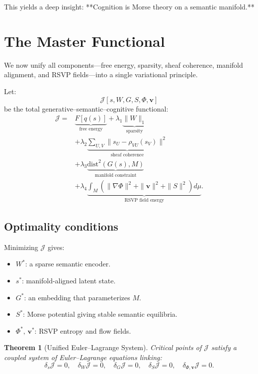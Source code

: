 \documentclass[11pt,a4paper,twocolumn]{article}
\newtheorem{theorem}{Theorem}[section]
\begin{document}
This yields a deep insight:  
**Cognition is Morse theory on a semantic manifold.**



\section{The Master Functional}

We now unify all components—free energy, sparsity, sheaf coherence,
manifold alignment, and RSVP fields—into a single variational principle.

Let:
\[
\mathcal{J}[s, W, G, S, \Phi, \mathbf{v}]
\]
be the total generative–semantic–cognitive functional:
\begin{align}
\mathcal{J}
=
&\underbrace{F[q(s)]}_{\text{free energy}}
+ \lambda_1 \underbrace{\|W\|_1}_{\text{sparsity}} \\
&+ \lambda_2 \underbrace{\sum_{U,V} \|s_U - \rho_{VU}(s_V)\|^2}_{\text{sheaf coherence}} \\
&+ \lambda_3 \underbrace{\mathrm{dist}^2(G(s), M)}_{\text{manifold constraint}} \\
&+ \lambda_4 \underbrace{\int_M \left(\|\nabla \Phi\|^2 + \|\mathbf{v}\|^2 + \|S\|^2\right) d\mu}_{\text{RSVP field energy}}.
\end{align}

\subsection{Optimality conditions}

Minimizing $\mathcal{J}$ gives:

\begin{itemize}
\item $W^\ast$: a sparse semantic encoder.
\item $s^\ast$: manifold-aligned latent state.
\item $G^\ast$: an embedding that parameterizes $M$.
\item $S^\ast$: Morse potential giving stable semantic equilibria.
\item $\Phi^\ast,\,\mathbf{v}^\ast$: RSVP entropy and flow fields.
\end{itemize}

\begin{theorem}[Unified Euler–Lagrange System]
Critical points of $\mathcal{J}$ satisfy a coupled system of
Euler–Lagrange equations linking:
\[
\delta_s \mathcal{J} = 0, \quad
\delta_W \mathcal{J} = 0, \quad
\delta_G \mathcal{J} = 0, \quad
\delta_S \mathcal{J} = 0, \quad
\delta_{\Phi,\mathbf{v}} \mathcal{J} = 0.
\]
\end{theorem}
\end{document}

